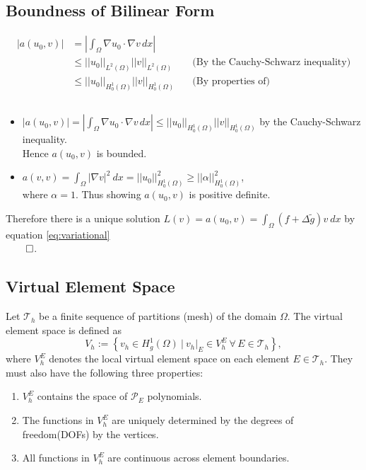 \documentclass{report}
\begin{document}
\subsection{Boundness of Bilinear Form}
\begin{align*}
    |a(u_0,v)| &= \left|\int_{\Omega}\nabla u_0 \cdot \nabla v\,dx\right|&\\ 
    &\leq||u_0||_{L^2(\Omega)} ||v||_{L^2(\Omega)} \quad&\text{(By the Cauchy-Schwarz inequality)}\\
    &\leq||u_0||_{H^1_0(\Omega)} ||v||_{H^1_0(\Omega)} \quad&\text{(By properties of)}
\end{align*}

\subsection{}


\begin{itemize}
    \item \mathbf
    $|a(u_0,v)| = \left|\int_{\Omega}\nabla u_0 \cdot \nabla v\,dx \right|\leq ||u_0||_{H^1_0(\Omega)} ||v||_{H^1_0(\Omega)} $ by the Cauchy-Schwarz inequality.\\
    Hence $a(u_0,v)$ is bounded.

    \item $a(v,v) = \int_{\Omega}|\nabla v|^2\ dx = ||u_0||^2_{H_0^1(\Omega)} \geq ||\alpha||^2_{H_0^1(\Omega)}$,\\
    where $\alpha = 1.$ Thus showing $a(u_0,v)$ is positive definite.
\end{itemize}

Therefore there is a unique solution $L(v) = a(u_0,v) = \int_\Omega (f + \Delta\tilde{g})v\ dx$ by equation \eqref{eq:variational}\\
$\qed$.


\subsection{Virtual Element Space}
Let $\mathcal{T}_h$ be a finite sequence of partitions (mesh) of the domain $\Omega$. The virtual element space is defined as
$$
V_h := \left\{ v_h \in H^1_g(\Omega) \ \bigg| \ v_h|_E \in V_h^E \ \forall \, E \in \mathcal{T}_h \right\},
$$
where $V_h^E$ denotes the local virtual element space on each element $E \in \mathcal{T}_h$. They must also have the following three properties:
\begin{enumerate}
    \item $V^E_h$ contains the space of $\mathcal{P}_E$ polynomials.

    \item The functions in $V^E_h$ are uniquely determined by the degrees of freedom(DOFs) by the vertices. %

    \item All functions in $V^E_h$ are continuous across element boundaries.
\end{enumerate}
\cite{sutton2017virtual}
\end{document}
